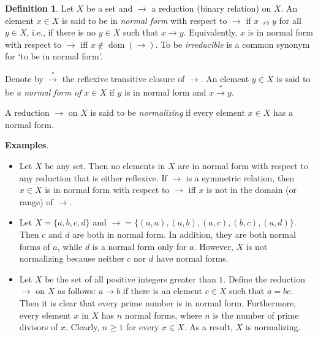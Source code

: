 \documentclass[12pt]{article}
\theoremstyle{definition}
\newtheorem{definition}[thm]{Definition}
\begin{document}
\begin{definition}
Let $X$ be a set and $\rightarrow$ a reduction (binary relation) on $X$. An element \(x \in X\) is said to be in \emph{normal form} with respect to $\rightarrow$ if \(x \nrightarrow y\) for all \(y \in X\), i.e., if there is no \(y \in X\) such that \(x \rightarrow y\). Equivalently, $x$ is in normal form with respect to $\to$ iff $x\notin \operatorname{dom}(\to)$.  To be \emph{irreducible} is a common synonym for `to be in normal form'.
  
Denote by $\stackrel{*}{\rightarrow}$ the reflexive transitive closure of $\rightarrow$. An element \(y \in X\) is said to be \emph{a normal form of} \(x \in X\) if $y$ is in normal form and \(x \stackrel{*}{\rightarrow} y\).

A reduction $\to$ on $X$ is said to be \emph{normalizing} if every element $x\in X$ has a normal form.
\end{definition}

\textbf{Examples}.  
\begin{itemize}
\item
Let $X$ be any set.  Then no elements in $X$ are in normal form with respect to any reduction that is either reflexive.  If $\to$ is a symmetric relation, then $x\in X$ is in normal form with respect to $\to$ iff $x$ is not in the domain (or range) of $\to$.
\item
Let $X=\lbrace a,b,c,d\rbrace$ and $\to = \lbrace (a,a),(a,b),(a,c),(b,c),(a,d)\rbrace$.  Then $c$ and $d$ are both in normal form.  In addition, they are both normal forms of $a$, while $d$ is a normal form only for $a$.  However, $X$ is not normalizing because neither $c$ nor $d$ have normal forms.
\item
Let $X$ be the set of all positive integers greater than $1$.  Define the reduction $\to$ on $X$ as follows: $a\to b$ if there is an element $c\in X$ such that $a=bc$.  Then it is clear that every prime number is in normal form.  Furthermore, every element $x$ in $X$ has $n$ normal forms, where $n$ is the number of prime divisors of $x$.  Clearly, $n\ge 1$ for every $x\in X$.  As a result, $X$ is normalizing.
\end{itemize}
\end{document}
